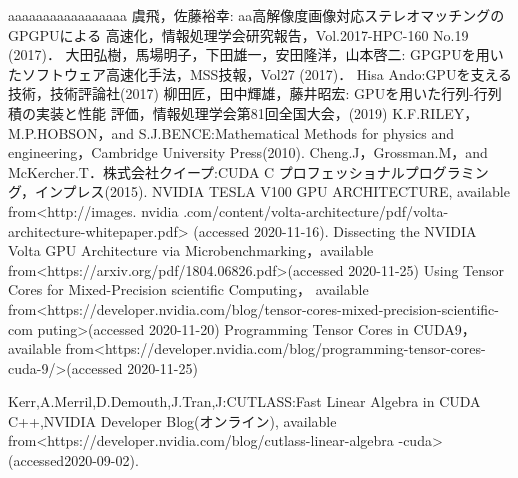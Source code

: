 
\begin{thebibliography}{99}
	  aaaaaaaaaaaaaaaaa
	 虞飛，佐藤裕幸: aa高解像度画像対応ステレオマッチングのGPGPUによる
	  高速化，情報処理学会研究報告，Vol.2017-HPC-160 No.19 (2017)．
	  大田弘樹，馬場明子，下田雄一，安田隆洋，山本啓二: GPGPUを用い
	  たソフトウェア高速化手法，MSS技報，Vol27 (2017)．
	  Hisa Ando:GPUを支える技術，技術評論社(2017)
	  柳田匠，田中輝雄，藤井昭宏: GPUを用いた行列-行列積の実装と性能
	  評価，情報処理学会第81回全国大会，(2019)
	  K.F.RILEY，M.P.HOBSON，and S.J.BENCE:Mathematical Methods for
	  physics and engineering，Cambridge University Press(2010).
	  Cheng.J，Grossman.M，and McKercher.T．株式会社クイープ:CUDA C
	  プロフェッショナルプログラミング，インプレス(2015).
	  NVIDIA TESLA V100 GPU ARCHITECTURE, available from<http://images.
nvidia .com/content/volta-architecture/pdf/volta-architecture-whitepaper.pdf>
	  (accessed 2020-11-16).
	  Dissecting the NVIDIA Volta GPU Architecture via
	  Microbenchmarking，available
	  from<https://arxiv.org/pdf/1804.06826.pdf>(accessed
	  2020-11-25)
	  Using Tensor Cores for Mixed-Precision scientific Computing，
	  available
	  from<https://developer.nvidia.com/blog/tensor-cores-mixed-precision-scientific-com
	  puting>(accessed 2020-11-20)
	  Programming Tensor Cores in CUDA9，available
	  from<https://developer.nvidia.com/blog/programming-tensor-cores-cuda-9/>(accessed
	  2020-11-25)
	  
	 Kerr,A.Merril,D.Demouth,J.Tran,J:CUTLASS:Fast Linear
	 Algebra in CUDA C++,NVIDIA Developer Blog(オンライン),
	 available
	 from<https://developer.nvidia.com/blog/cutlass-linear-algebra
	 -cuda>(accessed2020-09-02).
	 
\end{thebibliography}
